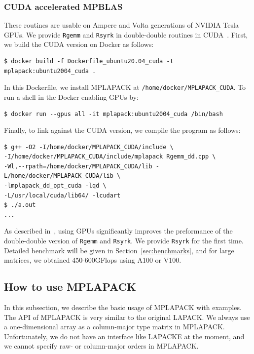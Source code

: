 \documentclass[12pt]{article}
\begin{document}
\subsubsection{CUDA accelerated MPBLAS}
These routines are usable on Ampere and Volta generations of NVIDIA Tesla GPUs.
We provide {\tt Rgemm} and {\tt Rsyrk} in double-double routines in CUDA~\cite{6424545}. First, we build the CUDA version on Docker as follows:
\begin{verbatim}
$ docker build -f Dockerfile_ubuntu20.04_cuda -t mplapack:ubuntu2004_cuda .
\end{verbatim}
In this Dockerfile, we install MPLAPACK at {\tt /home/docker/MPLAPACK\_CUDA}.
To run a shell in the Docker enabling GPUs by:
\begin{verbatim}
$ docker run --gpus all -it mplapack:ubuntu2004_cuda /bin/bash
\end{verbatim}
Finally, to link against the CUDA version, we compile the program as follows:
\begin{verbatim}
$ g++ -O2 -I/home/docker/MPLAPACK_CUDA/include \
-I/home/docker/MPLAPACK_CUDA/include/mplapack Rgemm_dd.cpp \
-Wl,--rpath=/home/docker/MPLAPACK_CUDA/lib -L/home/docker/MPLAPACK_CUDA/lib \
-lmplapack_dd_opt_cuda -lqd \
-L/usr/local/cuda/lib64/ -lcudart
$ ./a.out
...
\end{verbatim}
As described in~\cite{6424545}, using GPUs significantly improves the preformance of the double-double version of {\tt Rgemm} and {\tt Rsyrk}. We provide {\tt Rsyrk} for the first time. Detailed benchmark will be given in Section~\ref{sec:benchmarks}, and for large matrices, we obtained 450-600GFlops using A100 or V100.

\subsection{How to use MPLAPACK}

In this subsection, we describe the basic usage of MPLAPACK with examples. The API of MPLAPACK is very similar to the original LAPACK. We always use a one-dimensional array as a column-major type matrix in MPLAPACK. Unfortunately, we do not have an interface like LAPACKE at the moment, and we cannot specify raw- or column-major orders in MPLAPACK.
\end{document}
